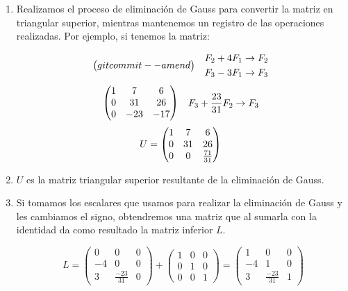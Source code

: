 \documentclass[letterpaper,12pt]{article}
\begin{document}
\begin{enumerate}
    \item Realizamos el proceso de eliminación de Gauss para convertir la matriz en triangular superior, mientras mantenemos un registro de las operaciones realizadas. Por ejemplo, si tenemos la matriz:
    
    \[
    \begin{array}{@{}cl}
    \begin{pmatrix}git commit --amend
    \end{pmatrix}
    &
    \begin{aligned}
        F_2 + 4F_1 \rightarrow F_2 \\
        F_3 - 3F_1 \rightarrow F_3
    \end{aligned}

    \end{array}
\]
   \[
    \begin{array}{@{}cl}
    \begin{pmatrix}
    1 & 7 & 6 \\
    0 & 31 & 26 \\
    0 & -23 & -17
    \end{pmatrix}
    &
    \begin{aligned}
        F_3 + \frac{23}{31}F_2 \rightarrow F_3
    \end{aligned}

    \end{array}
\]
\[ U =
    \begin{array}{@{}cl}
    \begin{pmatrix}
    1 & 7 & 6 \\
    0 & 31 & 26 \\
    0 & 0 & \frac{71}{31}
    \end{pmatrix}
    \end{array}
    \]
    
    \item \(U\) es la matriz triangular superior resultante de la eliminación de Gauss.

    \item Si tomamos los escalares que usamos para realizar la eliminación de Gauss y les cambiamos el signo, obtendremos una matriz que al sumarla con la identidad da como resultado la matriz inferior \(L\).

\[
L = \begin{pmatrix}
    0 & 0 & 0 \\
    -4 & 0 & 0 \\
    3 & \frac{-23}{31} & 0
    \end{pmatrix}
    + 
    \begin{pmatrix}
    1 & 0 & 0 \\
    0 & 1 & 0 \\
    0 & 0 & 1
    \end{pmatrix}
    =
    \begin{pmatrix}
    1 & 0 & 0 \\
    -4 & 1 & 0 \\
    3 & \frac{-23}{31} & 1
    \end{pmatrix}
\]


\end{enumerate}
\end{document}
